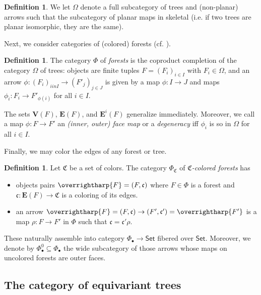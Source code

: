 \documentclass[a4paper,10pt
,draft
]{article}%
\numberwithin{equation}{section}
\numberwithin{figure}{section}
\theoremstyle{definition} %
\newtheorem{definition}[equation]{Definition}%
\newcommand{\vect}[1]{\text{\overrightharp{\ensuremath{#1}}}}
\newcommand{\Set}{\ensuremath{\mathsf{Set}}}
\newcommand{\1}{\ensuremath{\mathbbm 1}}%
\begin{document}
\begin{definition}
      We let $\Omega$ denote a full subcategory of trees and (non-planar) arrows
      such that the subcategory of planar maps in skeletal (i.e. if two trees are planar isomorphic, they are the same).
\end{definition}

Next, we consider categories of (colored) forests (cf. \cite[Defn. 2.56]{BP_HGOP}).

\begin{definition}
      The category $\Phi$ of \textit{forests} is the coproduct completion of the category $\Omega$ of trees:
      objects are finite tuples $F = (F_i)_{i \in I}$ with $F_i \in \Omega$,
      and an arrow $\phi \colon (F_i)_{i in I} \to (F'_j)_{j \in J}$ is given by
      a map $\phi \colon I \to J$ and
      maps $\phi_i \colon F_i \to F'_{\phi(i)}$ for all $i \in I$.
     
      The sets $\boldsymbol{V}(F)$, $\boldsymbol{E}(F)$, and $\boldsymbol{E}^i(F)$ generalize immediately.
      Moreover, we call a map $\phi \colon F \to F'$ an \textit{(inner, outer) face map} or a \textit{degeneracy} iff
      $\phi_i$ is so in $\Omega$ for all $i \in I$.
\end{definition}

Finally, we may color the edges of any forest or tree.
\begin{definition}            
      Let $\mathfrak C$ be a set of colors.
      The category $\Phi_{\mathfrak C}$ of \textit{$\mathfrak C$-colored forests} has
      \begin{itemize}
      \item objects pairs $\vect F = (F, \mathfrak c)$ where $F \in \Phi$ is a forest and
            $\mathfrak c \colon \boldsymbol{E}(F) \to \mathfrak C$ is a coloring of its edges.
      \item an arrow $\vect F = (F, \mathfrak c) \to (F', \mathfrak c') = \vect{F'}$ is a map
            $\rho\colon F \to F'$ in $\Phi$ such that $\mathfrak c = \mathfrak c' \rho$.
      \end{itemize}      

      These naturally assemble into category $\Phi_\bullet \to \Set$ fibered over $\Set$.
      Moreover, we denote by
      $\Phi_\bullet^0 \subseteq \Phi_\bullet$
      the wide subcategory of those arrows whose maps on uncolored forests are outer faces.
\end{definition}

\subsection{The category of equivariant trees}
\end{document}
